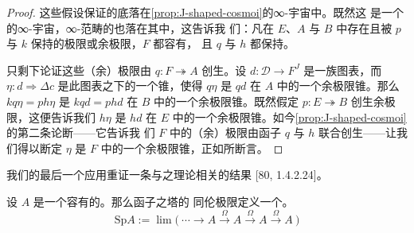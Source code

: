 \begin{proof}
这些假设保证\trPullback{}的底\trCospan{}落在\cref{prop:J-shaped-cosmoi}的∞-宇宙中。既然这
是一个\trCosmologicalEmbedding{}的∞-宇宙，∞-范畴的\trPullback{}也落在其中，这告诉我
们：凡在 $E$、$A$ 与 $B$ 中存在且被 $p$ 与 $k$ 保持的极限或余极限，$F$ 都容有，
且 $q$ 与 $h$ 都保持。

只剩下论证这些（余）极限由 $q\colon F\twoheadrightarrow A$ 创生。设
$d\colon\mathcal{D}\to F^{J}$ 是一族图表，而 $\eta\colon d\Rightarrow\Delta c$
是此图表之下的一个锥，使得 $q\eta$ 是 $qd$ 在 $A$ 中的一个余极限锥。那么
$kq\eta=ph\eta$ 是 $kqd=phd$ 在 $B$ 中的一个余极限锥。既然假定
$p\colon E\twoheadrightarrow B$ 创生余极限，这便告诉我们 $h\eta$ 是 $hd$ 在
$E$ 中的一个余极限锥。如今\cref{prop:J-shaped-cosmoi}的第二条论断——它告诉我
们 $F$ 中的（余）极限由函子 $q$ 与 $h$ 联合创生——让我们得以断定 $\eta$ 是
$F$ 中的一个余极限锥，正如所断言。
\end{proof}

我们的最后一个应用重证一条与\trStable{}\trInfinityCategory{}之理论相关的结果
[80, 1.4.2.24]。

\begin{lemma}\label{lem:spa-stable}
设 $A$ 是一个容有\trPullback{}的\trPointed{}\trInfinityCategory{}。那么\trLoops{}函子之塔的
同伦极限定义一个\trStable{}\trInfinityCategory{}。
\[
\mathrm{Sp}A:=\lim\Big(\ \cdots\longrightarrow A
\xrightarrow{\ \Omega\ }A
\xrightarrow{\ \Omega\ }A
\xrightarrow{\ \Omega\ }A\ \Big)
\]
\end{lemma}

